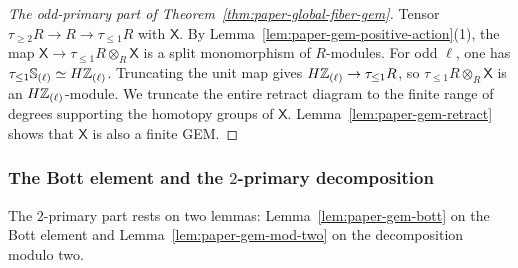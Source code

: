 \begin{proof}[The odd-primary part of Theorem~\ref{thm:paper-global-fiber-gem}]
Tensor $\tau_{\ge2}R\to R\to\tau_{\le1}R$ with $\mathsf{X}$.
By Lemma~\ref{lem:paper-gem-positive-action}(1), the map $\mathsf{X}\to \tau_{\le1}R\otimes_R \mathsf{X}$ is a split monomorphism of $R$-modules.
For odd $\ell$, one has $\tau_{\le1}\mathbb S_{(\ell)}\simeq H\mathbb Z_{(\ell)}$.
Truncating the unit map gives $H\mathbb Z_{(\ell)}\to\tau_{\le1}R$, so $\tau_{\le1}R\otimes_R \mathsf{X}$ is an $H\mathbb Z_{(\ell)}$-module.
We truncate the entire retract diagram to the finite range of degrees supporting the homotopy groups of $\mathsf{X}$.
Lemma~\ref{lem:paper-gem-retract} shows that $\mathsf{X}$ is also a finite GEM.
\end{proof}

\subsubsection{The Bott element and the \texorpdfstring{$2$}{2}-primary decomposition}
The $2$-primary part rests on two lemmas: Lemma~\ref{lem:paper-gem-bott} on the Bott element and Lemma~\ref{lem:paper-gem-mod-two} on the decomposition modulo two.

